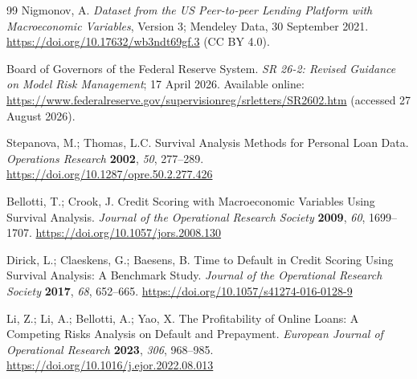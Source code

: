 \documentclass[10pt]{article}
\begin{document}
\begin{thebibliography}{99}
Nigmonov, A. \textit{Dataset from the US Peer-to-peer Lending Platform with Macroeconomic Variables}, Version 3; Mendeley Data, 30 September 2021. \url{https://doi.org/10.17632/wb3ndt69gf.3} (CC BY 4.0).

Board of Governors of the Federal Reserve System. \textit{SR 26-2: Revised Guidance on Model Risk Management}; 17 April 2026. Available online: \url{https://www.federalreserve.gov/supervisionreg/srletters/SR2602.htm} (accessed 27 August 2026).

Stepanova, M.; Thomas, L.C. Survival Analysis Methods for Personal Loan Data. \textit{Operations Research} \textbf{2002}, \textit{50}, 277--289. \url{https://doi.org/10.1287/opre.50.2.277.426}

Bellotti, T.; Crook, J. Credit Scoring with Macroeconomic Variables Using Survival Analysis. \textit{Journal of the Operational Research Society} \textbf{2009}, \textit{60}, 1699--1707. \url{https://doi.org/10.1057/jors.2008.130}

Dirick, L.; Claeskens, G.; Baesens, B. Time to Default in Credit Scoring Using Survival Analysis: A Benchmark Study. \textit{Journal of the Operational Research Society} \textbf{2017}, \textit{68}, 652--665. \url{https://doi.org/10.1057/s41274-016-0128-9}

Li, Z.; Li, A.; Bellotti, A.; Yao, X. The Profitability of Online Loans: A Competing Risks Analysis on Default and Prepayment. \textit{European Journal of Operational Research} \textbf{2023}, \textit{306}, 968--985. \url{https://doi.org/10.1016/j.ejor.2022.08.013}


\end{thebibliography}
\end{document}
